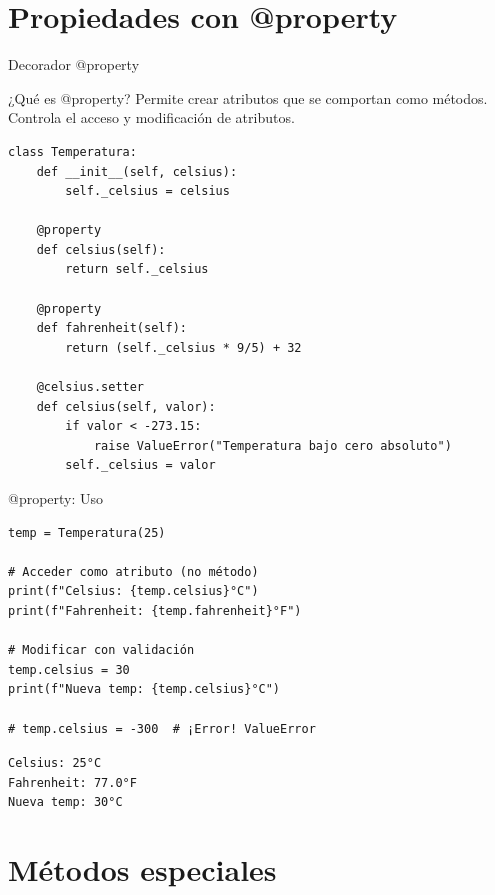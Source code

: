 \documentclass{beamer}
\begin{document}
\section{Propiedades con @property}

\begin{frame}[fragile]{Decorador @property \faGem}
\begin{conceptbox}{¿Qué es @property?}
Permite crear atributos que se comportan como métodos. Controla el acceso y modificación de atributos.
\end{conceptbox}

\begin{lstlisting}
class Temperatura:
    def __init__(self, celsius):
        self._celsius = celsius
    
    @property
    def celsius(self):
        return self._celsius
    
    @property
    def fahrenheit(self):
        return (self._celsius * 9/5) + 32
    
    @celsius.setter
    def celsius(self, valor):
        if valor < -273.15:
            raise ValueError("Temperatura bajo cero absoluto")
        self._celsius = valor
\end{lstlisting}
\end{frame}

\begin{frame}[fragile]{@property: Uso \faThermometer}
\begin{lstlisting}
temp = Temperatura(25)

# Acceder como atributo (no método)
print(f"Celsius: {temp.celsius}°C")
print(f"Fahrenheit: {temp.fahrenheit}°F")

# Modificar con validación
temp.celsius = 30
print(f"Nueva temp: {temp.celsius}°C")

# temp.celsius = -300  # ¡Error! ValueError
\end{lstlisting}

\vspace{-0.2cm}
\begin{tcolorbox}[colback=green!10,colframe=green,title={\small\faArrowCircleRight \ Salida},coltitle=fg0,left=3pt,right=3pt,top=3pt,bottom=3pt,boxsep=2pt]
\small\texttt{Celsius: 25°C\\
Fahrenheit: 77.0°F\\
Nueva temp: 30°C}
\end{tcolorbox}
\end{frame}

\section{Métodos especiales}
\end{document}
